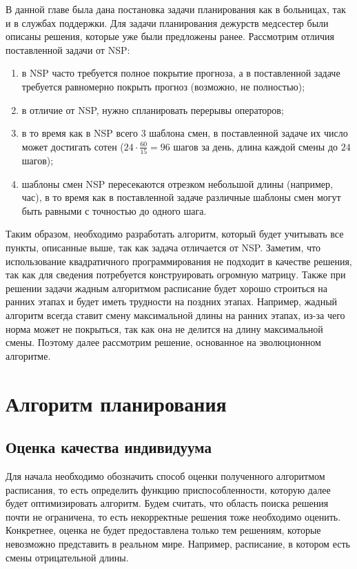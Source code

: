 \documentclass[times,specification,annotation]{itmo-student-thesis}
\begin{document}
\chapterconclusion

В данной главе была дана постановка задачи планирования как в больницах, так и в службах поддержки.
Для задачи планирования дежурств медсестер были описаны решения, которые уже были предложены ранее.
Рассмотрим отличия поставленной задачи от NSP:

\begin{enumerate}
    \item в NSP часто требуется полное покрытие прогноза, а в поставленной задаче требуется равномерно покрыть прогноз (возможно, не полностью);
    \item в отличие от NSP, нужно спланировать перерывы операторов;
    \item в то время как в NSP всего 3 шаблона смен, в поставленной задаче их число может достигать сотен ($24 \cdot \frac{60}{15} = 96$ шагов за день, длина каждой смены до $24$ шагов);
    \item шаблоны смен NSP пересекаются отрезком небольшой длины (например, час), в то время как в поставленной задаче различные шаблоны смен могут быть равными с точностью до одного шага.
\end{enumerate}

Таким образом, необходимо разработать алгоритм, который будет учитывать все пункты, описанные выше, так как задача отличается от NSP.
Заметим, что использование квадратичного программирования не подходит в качестве решения, так как для сведения потребуется конструировать огромную матрицу.
Также при решении задачи жадным алгоритмом расписание будет хорошо строиться на ранних этапах и будет иметь трудности на поздних этапах.
Например, жадный алгоритм всегда ставит смену максимальной длины на ранних этапах, из-за чего норма может не покрыться, так как она не делится на длину максимальной смены.
Поэтому далее рассмотрим решение, основанное на эволюционном алгоритме.

\chapter{Алгоритм планирования}

\section{Оценка качества индивидуума}

Для начала необходимо обозначить способ оценки полученного алгоритмом расписания, то есть определить функцию приспособленности, которую далее будет оптимизировать алгоритм.
Будем считать, что область поиска решения почти не ограничена, то есть некорректные решения тоже необходимо оценить.
Конкретнее, оценка не будет предоставлена только тем решениям, которые невозможно представить в реальном мире.
Например, расписание, в котором есть смены отрицательной длины.
\end{document}

